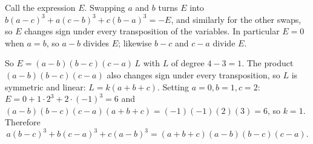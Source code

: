 Call the expression $E$. Swapping $a$ and $b$ turns $E$ into $b(a-c)^3+a(c-b)^3+c(b-a)^3=-E$, and similarly for the other swaps, so $E$ changes sign under every transposition of the variables. In particular $E=0$ when $a=b$, so $a-b$ divides $E$; likewise $b-c$ and $c-a$ divide $E$.

So $E=(a-b)(b-c)(c-a)\,L$ with $L$ of degree $4-3=1$. The product $(a-b)(b-c)(c-a)$ also changes sign under every transposition, so $L$ is symmetric and linear: $L=k(a+b+c)$. Setting $a=0,b=1,c=2$: $E=0+1\cdot2^3+2\cdot(-1)^3=6$ and $(a-b)(b-c)(c-a)(a+b+c)=(-1)(-1)(2)(3)=6$, so $k=1$. Therefore
\[\boxed{a(b-c)^3+b(c-a)^3+c(a-b)^3=(a+b+c)(a-b)(b-c)(c-a)}.\]

